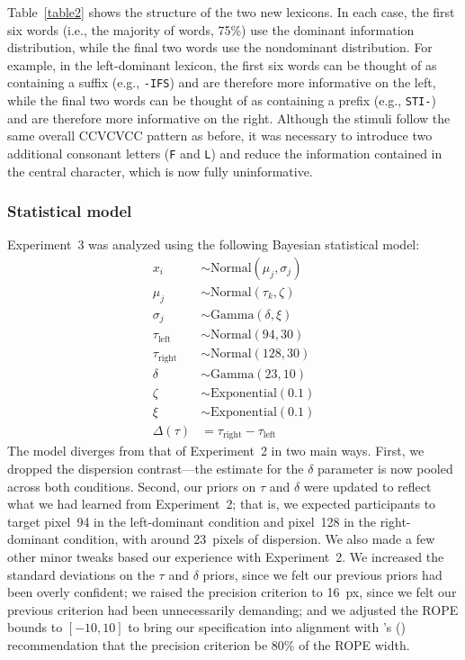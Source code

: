 \documentclass[doc,biblatex,floatsintext]{apa7}
\newcommand\possessivecite[1]{\citeauthor{#1}'s (\citeyear{#1})} %
\begin{document}
Table~\ref{table2} shows the structure of the two new lexicons. In each case, the first six words (i.e., the majority of words, 75\%) use the dominant information distribution, while the final two words use the nondominant distribution. For example, in the left-dominant lexicon, the first six words can be thought of as containing a suffix (e.g., \texttt{-IFS}) and are therefore more informative on the left, while the final two words can be thought of as containing a prefix (e.g., \texttt{STI-}) and are therefore more informative on the right. Although the stimuli follow the same overall CCVCVCC pattern as before, it was necessary to introduce two additional consonant letters (\texttt{F} and \texttt{L}) and reduce the information contained in the central character, which is now fully uninformative.

\subsubsection{Statistical model}

Experiment~3 was analyzed using the following Bayesian statistical model:
\begin{align*}
               x_{i} & \sim \mathrm{Normal}(\mu_{j}, \sigma_{j}) \\
             \mu_{j} & \sim \mathrm{Normal}(\tau_k, \zeta) \\
          \sigma_{j} & \sim \mathrm{Gamma}(\delta, \xi) \\
  \tau_\mathrm{left} & \sim \mathrm{Normal}(94, 30) \\
 \tau_\mathrm{right} & \sim \mathrm{Normal}(128, 30) \\
              \delta & \sim \mathrm{Gamma}(23, 10) \\
               \zeta & \sim \mathrm{Exponential}(0.1) \\
                 \xi & \sim \mathrm{Exponential}(0.1) \\
        \Delta(\tau) & = \tau_\mathrm{right} - \tau_\mathrm{left}
\end{align*}
The model diverges from that of Experiment~2 in two main ways. First, we dropped the dispersion contrast---the estimate for the $\delta$ parameter is now pooled across both conditions. Second, our priors on $\tau$ and $\delta$ were updated to reflect what we had learned from Experiment~2; that is, we expected participants to target pixel~94 in the left-dominant condition and pixel~128 in the right-dominant condition, with around 23~pixels of dispersion. We also made a few other minor tweaks based our experience with Experiment~2. We increased the standard deviations on the $\tau$ and $\delta$ priors, since we felt our previous priors had been overly confident; we raised the precision criterion to 16~px, since we felt our previous criterion had been unnecessarily demanding; and we adjusted the ROPE bounds to $[-10, 10]$ to bring our specification into alignment with \possessivecite{Kruschke:2015} recommendation that the precision criterion be 80\% of the ROPE width.
\end{document}
